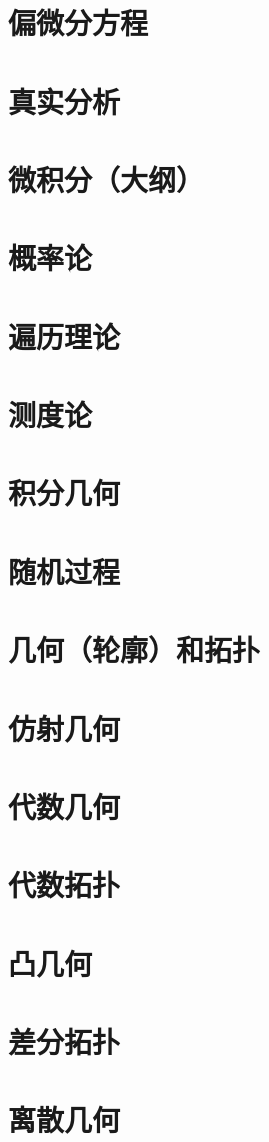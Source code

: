 \documentclass[UTF8]{NatureUniverse}
\begin{document}
\section{偏微分方程}
\section{真实分析}
\section{微积分（大纲）}
\section{概率论}
\section{遍历理论}
\section{测度论}
\section{积分几何}
\section{随机过程}
\section{几何（轮廓）和拓扑}
\section{仿射几何}
\section{代数几何}
\section{代数拓扑}
\section{凸几何}
\section{差分拓扑}
\section{离散几何}
\end{document}

